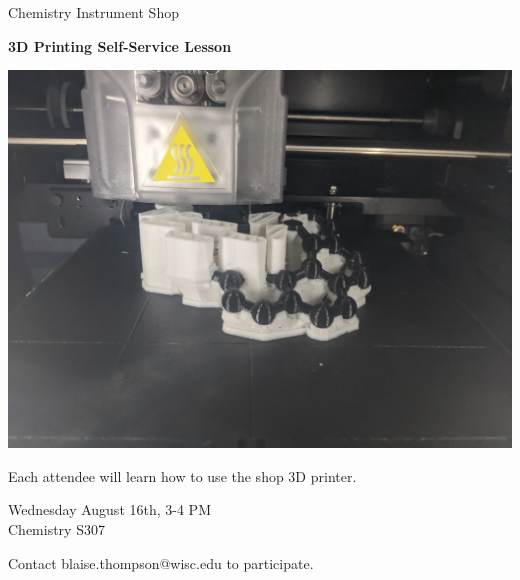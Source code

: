 \documentclass{article}
\begin{document}
\center

\Huge

Chemistry Instrument Shop

\textbf{
3D Printing
Self-Service Lesson
}

\includegraphics[width=\linewidth]{coverart.jpg}

{
\huge
Each attendee will learn how to use the shop 3D printer.
}

\vfill

{
\huge
Wednesday August 16th, 3-4 PM \\
Chemistry S307 \\
}

\vfill

{
\huge
Contact blaise.thompson@wisc.edu to participate.
}
\end{document}
